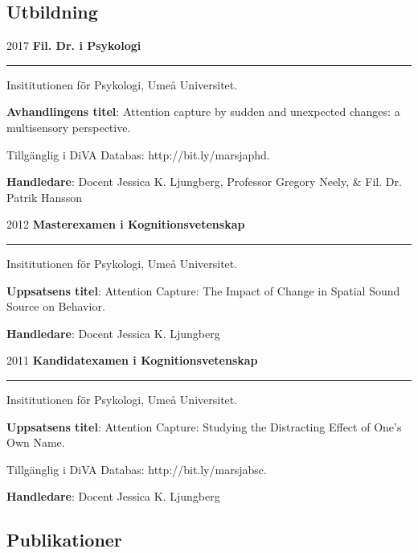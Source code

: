 \documentclass[]{article}
\begin{document}
\subsection{Utbildning}\label{utbildning}

2017 \hspace{1.5cm}\textbf{Fil. Dr. i Psykologi} \hrule

\begin{changemargin}{2.3cm}{2.4cm}

Insititutionen för Psykologi, Umeå Universitet.

\textbf{Avhandlingens titel}: Attention capture by sudden and unexpected changes: a multisensory perspective. 

Tillgänglig i DiVA Databas: http://bit.ly/marsjaphd.

\textbf{Handledare}: Docent Jessica K. Ljungberg, Professor Gregory Neely, \& Fil. Dr. Patrik Hansson

\end{changemargin}

2012 \hspace{1.5cm}\textbf{Masterexamen i Kognitionsvetenskap} \hrule

\begin{changemargin}{2.3cm}{2.4cm}

Insititutionen för Psykologi, Umeå Universitet.

\textbf{Uppsatsens titel}: Attention Capture: The Impact of Change in Spatial Sound Source on Behavior. 
    
\textbf{Handledare}: Docent Jessica K. Ljungberg
    
\end{changemargin}

2011 \hspace{1.5cm}\textbf{Kandidatexamen i Kognitionsvetenskap} \hrule

\begin{changemargin}{2.3cm}{2.4cm}

Insititutionen för Psykologi, Umeå Universitet.

\textbf{Uppsatsens titel}:  Attention Capture: Studying the Distracting Effect of One’s Own Name. 

Tillgänglig i DiVA Databas: http://bit.ly/marsjabsc.
    
\textbf{Handledare}: Docent Jessica K. Ljungberg

\end{changemargin}

\subsection{Publikationer}\label{publikationer}
\end{document}
